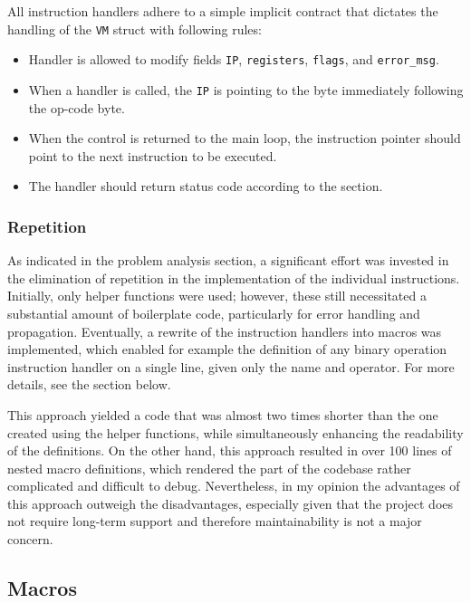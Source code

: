 \documentclass[10pt,a4paper,final]{article}
\newcommand{\code}[1]{\texttt{#1}}
\begin{document}
All instruction handlers adhere to a simple implicit contract that dictates the
handling of the \code{VM} struct with following rules:

\begin{itemize}
    \item Handler is allowed to modify fields \code{IP}, \code{registers},
        \code{flags}, and \code{error_msg}.
    \item When a handler is called, the \code{IP} is pointing to the byte
        immediately following the op-code byte. 
    \item When the control is returned to the main loop, the instruction pointer
        should point to the next instruction to be executed.
    \item The handler should return status code according to the
         section.
\end{itemize}



\subsubsection{Repetition}
\label{sec:repetition}

As indicated in the problem analysis section, a significant effort was invested
in the elimination of repetition in the implementation of the individual
instructions. Initially, only helper functions were used; however, these still
necessitated a substantial amount of boilerplate code, particularly for error
handling and propagation. Eventually, a rewrite of the instruction handlers into
macros was implemented, which enabled for example the definition of any binary
operation instruction handler on a single line, given only the name and
operator. For more details, see the section  below.

This approach yielded a code that was almost two times shorter than the one
created using the helper functions, while simultaneously enhancing the
readability of the definitions. On the other hand, this approach resulted in
over 100 lines of nested macro definitions, which rendered the part of the
codebase rather complicated and difficult to debug. Nevertheless, in my opinion
the advantages of this approach outweigh the disadvantages, especially given
that the project does not require long-term support and therefore
maintainability is not a major concern.

\subsection{Macros}
\label{sec:macros}
\end{document}
